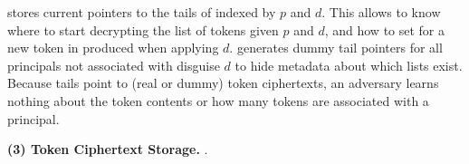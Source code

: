 \sys stores current pointers to the tails of  indexed by $p$ and $d$. This allows \sys to
know where to start decrypting the list of tokens given $p$ and $d$, and how to set
 for a new token in  produced when applying $d$. \sys generates dummy
tail pointers for all principals not associated with disguise $d$ to hide metadata about which lists
exist.
Because  tails point to (real or dummy) token ciphertexts, an adversary learns nothing
about the token contents or how many tokens are associated with a principal.

\vspace{6pt}\noindent\textbf{(3) \tpriv{} Token Ciphertext Storage.}
.
\fi
